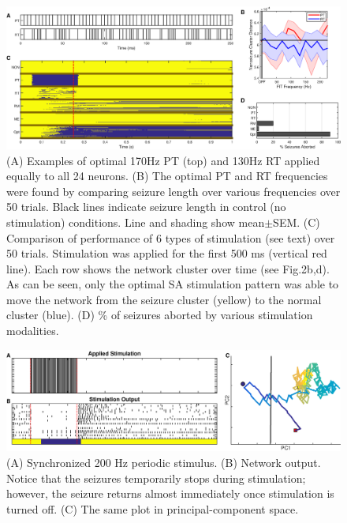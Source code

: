 \documentclass[journal,twoside,web]{ieeecolor}
\newcommand{\nn}{24}    %
\newcommand{\fit}{170}    %
\newcommand{\rit}{130}    %
\begin{document}
\begin{figure}[!ht]
	\centering
	\includegraphics[width=180mm]{MC}
	\caption[Simulated Annealing Monte Carlo Analysis]{
		(A) Examples of optimal \fit{}Hz PT (top) and \rit{}Hz RT applied equally to all \nn{} neurons.
		(B) The optimal PT and RT frequencies were found by comparing seizure length over various frequencies over 50 trials. Black lines indicate seizure length in control (no stimulation) conditions. Line and shading show mean$\pm$SEM.
		(C) Comparison of performance of 6 types of stimulation (see text) over 50 trials. Stimulation was applied for the first 500 ms (vertical red line). Each row shows the network cluster over time (see Fig.2b,d). As can be seen, only the optimal SA stimulation pattern was able to move the network from the seizure cluster (yellow) to the normal cluster (blue).
		(D) \% of seizures aborted by various stimulation modalities.
	}
	\label{MC}
\end{figure}


\begin{figure}[!ht]
	\centering
	\includegraphics[width=180mm]{FITstim}
	\caption[Periodic Stimulation]{
		(A) Synchronized 200 Hz periodic stimulus.
		(B) Network output. Notice that the seizures temporarily stops during stimulation; however, the seizure returns almost immediately once stimulation is turned off.
		(C) The same plot in principal-component space.}
	\label{FITstim}
\end{figure}
\end{document}
